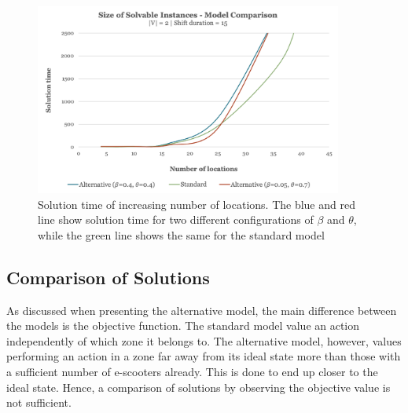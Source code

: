 \begin{figure}[h]
    \centering
    \includegraphics[width=0.9\textwidth]{Images/Computational Study/comp_loc.png}
    \caption{Solution time of increasing number of locations. The blue and red line show solution time for two different configurations of $\beta$ and $\theta$, while the green line shows the same for the standard model}
    \label{fig:SizeOfSolvableInstancesAltModel}
\end{figure}

\subsection{Comparison of Solutions}
As discussed when presenting the alternative model, the main difference between the models is the objective function. The standard model value an action independently of which zone it belongs to. The alternative model, however, values performing an action in a zone far away from its ideal state more than those with a sufficient number of e-scooters already. This is done to end up closer to the ideal state. Hence, a comparison of solutions by observing the objective value is not sufficient.

